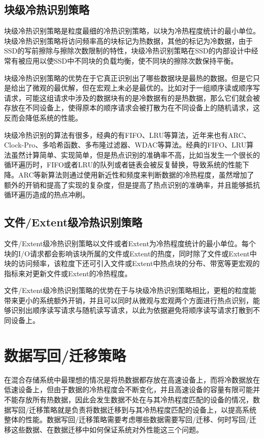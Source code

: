 \subsection{块级冷热识别策略}

块级冷热识别策略是粒度最细的冷热识别策略，以块为冷热程度统计的最小单位。块级冷热识别策略将访问频率高的块标记为热数据，其他的标记为冷数据，由于SSD的写前擦除与擦除次数限制的特性，块级冷热识别策略在SSD的内部设计中经常有被应用以使SSD中不同块的负载均衡，使不同块的擦除次数保持平衡。

块级冷热识别策略的优势在于它真正识别出了哪些数据块是最热的数据。但是它只是给出了微观的最优解，但在宏观上未必是最优的。比如对于一组顺序读或顺序写请求，可能这组请求中涉及的数据块有的是冷数据有的是热数据，那么它们就会被存放在不同设备上，使得原本的顺序请求会被打散为在不同设备上的随机请求，这反而会降低系统的性能。

块级冷热识别的算法有很多，经典的有FIFO、LRU等算法，近年来也有ARC\cite{megiddo2003arc}、Clock-Pro\cite{jiang2005clock}、多哈希函数\cite{hsieh2006efficient}、多布隆过滤器\cite{park2011hot}、WDAC\cite{park2011hot}等算法。经典的FIFO、LRU算法虽然计算简单、实现简单，但是热点识别的准确率不高，比如当发生一个很长的循环遍历时，FIFO或者LRU的队列或者链表会被反复替换，导致系统的性能下降。ARC等新算法则通过使用新近性和频度来判断数据的冷热程度，虽然增加了额外的开销和提高了实现的复杂度，但是提高了热点识别的准确率，并且能够抵抗循环遍历造成的热点冲刷。

\subsection{文件/Extent级冷热识别策略}

文件/Extent级冷热识别策略以文件或者Extent为冷热程度统计的最小单位。每个块的I/O请求都会影响该块所属的文件或Extent的热度，同时除了文件或Extent中块的访问频率，该粒度下还可引入文件或Extent中热点块的分布、带宽等更宏观的指标来对更新文件或Extent的冷热程度。

文件/Extent级冷热识别策略的优势在于与块级冷热识别策略相比，更粗的粒度能带来更小的系统额外开销，并且可以同时从微观与宏观两个方面进行热点识别，能够识别出顺序读写请求与随机读写请求，以此为依据避免将顺序读写请求打散到不同设备上。

\section{数据写回/迁移策略}

在混合存储系统中最理想的情况是将热数据都存放在高速设备上，而将冷数据放在低速设备上，但由于数据的冷热程度会不断变化，并且高速设备的容量有限可能并不能存放所有热数据，因此会发生数据不处在与其冷热程度匹配的设备的情况，数据写回/迁移策略就是负责将数据迁移到与其冷热程度匹配的设备上，以提高系统整体的性能。数据写回/迁移策略需要考虑哪些数据需要写回/迁移、何时写回/迁移这些数据、在数据迁移中如何保证系统对外性能这三个问题。

